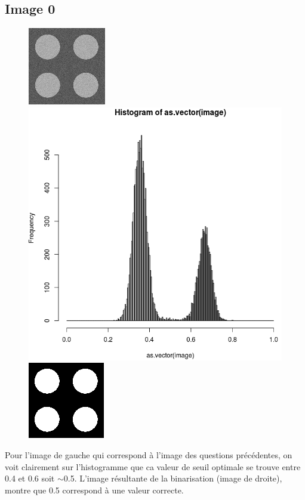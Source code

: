 \documentclass[a4paper,12pt]{report}
\begin{document}
\subsection*{Image 0}
\begin{figure}[!ht]
	\center
	\includegraphics[scale=0.5]{../rdf-2-classes-texture-0.png}
	\includegraphics[scale=0.3]{image/text0.png}
	\includegraphics[scale=0.5]{image/text01.png}
\end{figure}

Pour l'image de gauche qui correspond à l'image des questions précédentes, on voit clairement sur l'histogramme que ca valeur de seuil optimale se trouve entre 0.4 et 0.6 soit $\sim$0.5. L'image résultante de la binarisation (image de droite), montre que 0.5 correspond à une valeur correcte.
\end{document}
